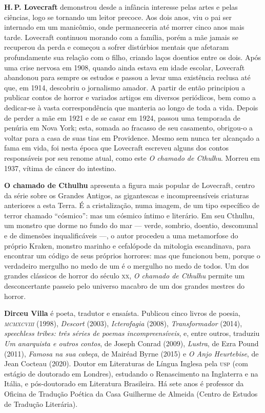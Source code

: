 \textbf{H.\,P. Lovecraft} demonstrou desde a infância interesse pelas artes e
pelas ciências, logo se tornando um leitor precoce. Aos dois anos, viu o pai ser internado em um manicômio, onde permaneceria até
morrer cinco anos mais tarde. Lovecraft continuou morando com a família,
porém a mãe jamais se recuperou da perda e começou a sofrer 
distúrbios mentais que afetaram profundamente sua relação com o filho,
criando laços doentios entre os dois. Após uma crise nervosa em 1908,
quando ainda estava em idade escolar, Lovecraft abandonou para sempre os
estudos e passou a levar uma existência reclusa até que, em 1914,
descobriu o jornalismo amador. A partir de então principiou a publicar
contos de horror e variados artigos em diversos periódicos, bem como a dedicar-se à vasta
correspondência que manteria ao longo de toda a vida.
Depois de perder a mãe em 1921 e de se casar em 1924, passou uma temporada
de penúria em Nova York; esta, somada ao fracasso de seu casamento,
obrigou-o a voltar para a casa de suas tias em Providence.
Mesmo sem nunca ter alcançado a fama em vida, foi nesta época que
Lovecraft escreveu alguns dos contos responsáveis por seu renome atual,
como este \emph{O chamado de Cthulhu}.
Morreu em 1937, vítima de câncer do intestino.

\textbf{O chamado de Cthulhu} apresenta a figura mais popular de Lovecraft, centro da série sobre os Grandes Antigos, as gigantescas e incompreensíveis criaturas anteriores a esta Terra. É a cristalização, numa imagem, de um tipo específico de terror chamado ``cósmico'': mas um cósmico íntimo e literário. Em seu Cthulhu, um monstro que dorme no fundo do mar --- verde, sombrio, doentio, descomunal e de dimensões inqualificáveis ---, o autor procedeu a uma metamorfose do próprio Kraken, monstro marinho e cefalópode da mitologia escandinava, para encontrar um código de seus próprios horrores: mas que funcionou bem, porque o verdadeiro mergulho no medo de um é o mergulho no medo de todos. Um dos grandes clássicos de horror do século \textsc{xx}, \textit{O chamado de Cthulhu} permite um desconcertante passeio pelo universo macabro de um dos grandes mestres do horror.

 
\textbf{Dirceu Villa} é poeta, tradutor e ensaísta. Publicou cinco livros de poesia, \emph{\textsc{mcmxcviii}} (1998), \emph{Descort} (2003), \emph{Icterofagia} (2008), \emph{Transformador} (2014), \emph{speechless tribes: três séries de poemas incompreensíveis}, e, entre outros, traduziu \emph{Um anarquista e outros contos}, de Joseph Conrad (2009), \emph{Lustra}, de Ezra Pound (2011), \emph{Famosa na sua cabeça}, de Mairéad Byrne (2015) e \emph{O Anjo Heurtebise}, de Jean Cocteau (2020). Doutor em Literaturas de Língua Inglesa pela \textsc{usp} (com estágio de doutorado em Londres), estudando o Renascimento na Inglaterra e na Itália, e pós-doutorado em Literatura Brasileira. Há sete anos é professor da Oficina de Tradução Poética da Casa Guilherme de Almeida (Centro de Estudos de Tradução Literária).

